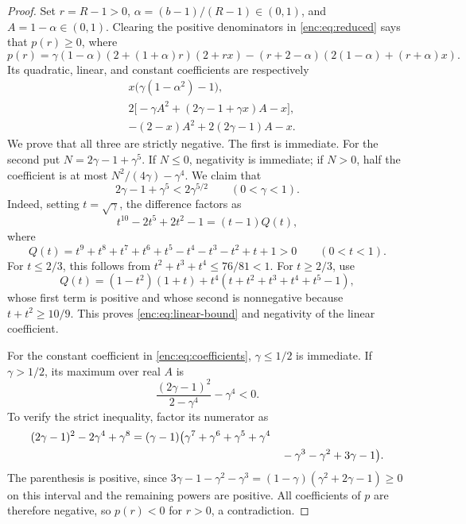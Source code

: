 \documentclass[11pt,letterpaper]{amsart}
\theoremstyle{definition}
\theoremstyle{remark}
\numberwithin{equation}{section}
\begin{document}
\begin{proof}
Set $r=R-1>0$, $\alpha=(b-1)/(R-1)\in(0,1)$, and
$A=1-\alpha\in(0,1)$. Clearing the positive denominators in
\eqref{enc:eq:reduced} says that $p(r)\ge0$, where
\[
 p(r)=\gamma(1-\alpha)(2+(1+\alpha)r)(2+rx)
       -(r+2-\alpha)(2(1-\alpha)+(r+\alpha)x).
\]
Its quadratic, linear, and constant coefficients are respectively
\begin{equation}\label{enc:eq:coefficients}
\begin{aligned}
 &x\bigl(\gamma(1-\alpha^2)-1\bigr),\\
 &2\bigl[-\gamma A^2+(2\gamma-1+\gamma x)A-x\bigr],\\
 &-(2-x)A^2+2(2\gamma-1)A-x.
\end{aligned}
\end{equation}
We prove that all three are strictly negative.
The first is immediate. For the second put
$N=2\gamma-1+\gamma^5$. If $N\le0$, negativity is immediate;
if $N>0$, half the coefficient is at most
$N^2/(4\gamma)-\gamma^4$. We claim that
\begin{equation}\label{enc:eq:linear-bound}
 2\gamma-1+\gamma^5<2\gamma^{5/2}\qquad(0<\gamma<1).
\end{equation}
Indeed, setting $t=\sqrt\gamma$, the difference factors as
\[
 t^{10}-2t^5+2t^2-1=(t-1)Q(t),
\]
where
\[
 Q(t)=t^9+t^8+t^7+t^6+t^5-t^4-t^3-t^2+t+1>0
 \qquad(0<t<1).
\]
For $t\le2/3$, this follows from
$t^2+t^3+t^4\le76/81<1$. For $t\ge2/3$, use
\[
 Q(t)=(1-t^2)(1+t)
       +t^4(t+t^2+t^3+t^4+t^5-1),
\]
whose first term is positive and whose second is nonnegative
because $t+t^2\ge10/9$. This proves
\eqref{enc:eq:linear-bound} and negativity of the linear coefficient.

For the constant coefficient in \eqref{enc:eq:coefficients},
$\gamma\le1/2$ is immediate. If $\gamma>1/2$, its maximum over
real $A$ is
\[
 \frac{(2\gamma-1)^2}{2-\gamma^4}-\gamma^4<0.
\]
To verify the strict inequality, factor its numerator as
\[
\begin{split}
 (2\gamma-1)^2-2\gamma^4+\gamma^8
 ={}&(\gamma-1)\bigl(\gamma^7+\gamma^6+\gamma^5+\gamma^4\\
 &\hspace{43mm}-\gamma^3-\gamma^2+3\gamma-1\bigr).
\end{split}
\]
The parenthesis is positive, since
$3\gamma-1-\gamma^2-\gamma^3
=(1-\gamma)(\gamma^2+2\gamma-1)\ge0$ on this interval and the
remaining powers are positive. All coefficients of $p$ are
therefore negative, so $p(r)<0$ for $r>0$, a contradiction.
\end{proof}
\end{document}

